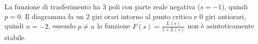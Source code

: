 \documentclass[10pt, letterpaper]{report}
\begin{document}
La funzione di trasferimento ha 3 poli con parte reale negativa ($s=-1$), quindi $p=0$. Il diagramma fa un 2 giri orari intorno al punto critico e 0 giri antiorari, quindi $n=-2$, essendo $p\ne n$ la funzione $F(s)=\frac{L(s)}{1+L(s)}$ non è asintoticamente stabile.\acc


















 
\end{document}
